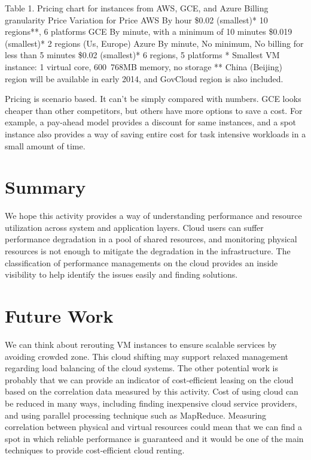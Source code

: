 \documentclass{sig-alternate}
\begin{document}
Table 1. Pricing chart for instances from AWS, GCE, and Azure
	Billing granularity	Price	Variation for Price
AWS	By hour	\$0.02 (smallest)*	10 regions**, 6 platforms
GCE	By minute, with a minimum of 10 minutes	\$0.019 (smallest)*	2 regions (Us, Europe)
Azure	By minute, No minimum, No billing for less than 5 minutes	\$0.02 (smallest)*	6 regions, 5 platforms
* Smallest VM instance: 1 virtual core, 600~768MB memory, no storage
** China (Beijing) region will be available in early 2014, and GovCloud region is also included.

Pricing is scenario based. It can't be simply compared with numbers. GCE looks cheaper than other competitors, but others have more options to save a cost. For example, a pay-ahead model provides a discount for same instances, and a spot instance also provides a way of saving entire cost for task intensive workloads in a small amount of time.


\section{Summary}

We hope this activity provides a way of understanding performance and resource utilization across system and application layers. Cloud users can suffer performance degradation in a pool of shared resources, and monitoring physical resources is not enough to mitigate the degradation in the infrastructure. The classification of performance managements on the cloud provides an inside visibility to help identify the issues easily and finding solutions.

\section{Future Work}

We can think about rerouting VM instances to ensure scalable services by avoiding crowded zone. This cloud shifting may support relaxed management regarding load balancing of the cloud systems. The other potential work is probably that we can provide an indicator of cost-efficient leasing on the cloud based on the correlation data measured by this activity. Cost of using cloud can be reduced in many ways, including finding inexpensive cloud service providers, and using parallel processing technique such as MapReduce. Measuring correlation between physical and virtual resources could mean that we can find a spot in which reliable performance is guaranteed and it would be one of the main techniques to provide cost-efficient cloud renting.
\end{document}
